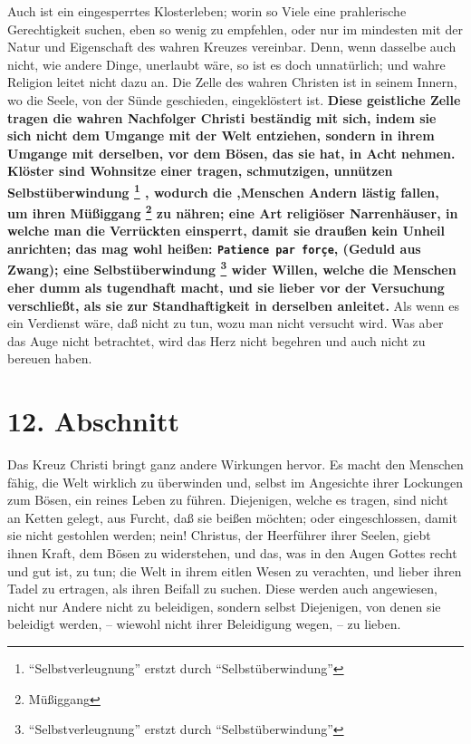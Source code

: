 Auch ist ein eingesperrtes Klosterleben; worin so Viele eine
prahlerische
Gerechtigkeit suchen, eben so wenig zu empfehlen, oder nur im mindesten mit der
Natur und Eigenschaft des wahren Kreuzes vereinbar. Denn, wenn dasselbe auch
nicht, wie andere Dinge, unerlaubt wäre, so ist es doch unnatürlich; und wahre
Religion leitet nicht dazu an. Die Zelle des wahren Christen ist in seinem
Innern, wo die Seele, von der Sünde geschieden, eingeklöstert ist. \textbf{Diese
geistliche Zelle tragen die wahren Nachfolger Christi beständig mit sich, indem
sie sich nicht dem Umgange mit der Welt entziehen, sondern in ihrem Umgange mit
derselben, vor dem Bösen, das sie hat, in Acht nehmen. Klöster sind Wohnsitze
einer tragen, schmutzigen, unnützen Selbstüberwindung \footnote{"`Selbstverleugnung"' erstzt durch "`Selbstüberwindung"'}
, wodurch die ,Menschen
Andern lästig fallen, um ihren Müßiggang \footnote{Müßiggang} zu nähren; eine
Art religiöser Narrenhäuser, in welche man die Verrückten einsperrt, damit sie draußen kein
Unheil anrichten; das mag wohl heißen: \texttt{Patience par forçe}, (Geduld aus
Zwang); eine Selbstüberwindung \footnote{"`Selbstverleugnung"' erstzt durch "`Selbstüberwindung"'} wider  Willen, welche die Menschen eher dumm als
tugendhaft macht, und sie lieber vor der Versuchung verschließt, als sie zur
Standhaftigkeit in derselben anleitet.} Als wenn es ein Verdienst wäre, daß nicht
zu tun, wozu man nicht versucht wird. Was aber das Auge nicht betrachtet, wird
das Herz nicht begehren und auch nicht zu bereuen haben.

\section{12. Abschnitt} \label{kap5_ab12}
Das Kreuz Christi bringt ganz andere Wirkungen hervor. Es macht den Menschen
fähig, die Welt wirklich zu überwinden und, selbst im Angesichte ihrer Lockungen
zum Bösen, ein reines Leben zu führen. Diejenigen, welche es tragen, sind nicht
an Ketten gelegt, aus Furcht, daß sie beißen möchten; oder eingeschlossen, damit
sie nicht gestohlen werden; nein! Christus, der Heerführer ihrer Seelen, giebt
ihnen Kraft, dem Bösen zu widerstehen, und das, was in den Augen Gottes recht
und gut ist, zu tun; die Welt in ihrem eitlen Wesen zu verachten, und lieber
ihren Tadel zu ertragen, als ihren Beifall zu suchen.  Diese werden auch
angewiesen, nicht nur Andere nicht zu beleidigen, sondern selbst Diejenigen, von
denen sie beleidigt werden, -- wiewohl nicht ihrer Beleidigung wegen, -- zu
lieben.

